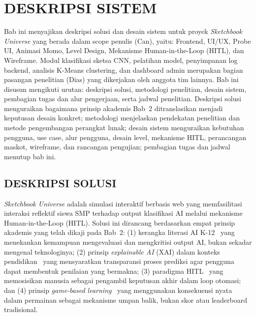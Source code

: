 \documentclass[12pt,a4paper,oneside,openany]{report}
\begin{document}
\chapter{DESKRIPSI SISTEM}
\label{chap:bab3}

Bab ini menyajikan deskripsi solusi dan desain sistem untuk proyek \textit{Sketchbook Universe} yang berada dalam scope penulis (Can), yaitu: Frontend, UI/UX, Probe UI, Animasi Momo, Level Design, Mekanisme Human-in-the-Loop (HITL), dan Wireframe. Modul klasifikasi sketsa CNN, pelatihan model, penyimpanan log backend, analisis K-Means clustering, dan dashboard admin merupakan bagian pasangan penelitian (Dias) yang dikerjakan oleh anggota tim lainnya. Bab ini disusun mengikuti urutan: deskripsi solusi, metodologi penelitian, desain sistem, pembagian tugas dan alur pengerjaan, serta jadwal penelitian. Deskripsi solusi menguraikan bagaimana prinsip akademis Bab~2 ditranslasikan menjadi keputusan desain konkret; metodologi menjelaskan pendekatan penelitian dan metode pengembangan perangkat lunak; desain sistem menguraikan kebutuhan pengguna, use case, alur pengguna, desain level, mekanisme HITL, perancangan maskot, wireframe, dan rancangan pengujian; pembagian tugas dan jadwal menutup bab ini.

\section{DESKRIPSI SOLUSI}
\label{sec:deskripsi-solusi}

\textit{Sketchbook Universe} adalah simulasi interaktif berbasis web yang memfasilitasi interaksi reflektif siswa SMP terhadap output klasifikasi AI melalui mekanisme Human-in-the-Loop (HITL). Solusi ini dirancang berdasarkan empat prinsip akademis yang telah dikaji pada Bab~2: (1) kerangka literasi AI K-12~\cite{ref2} yang menekankan kemampuan mengevaluasi dan mengkritisi output AI, bukan sekadar mengenal teknologinya; (2) prinsip \textit{explainable AI} (XAI) dalam konteks pendidikan~\cite{ref3} yang mensyaratkan transparansi proses prediksi agar pengguna dapat membentuk penilaian yang bermakna; (3) paradigma HITL~\cite{ref4}\cite{ref5} yang memosisikan manusia sebagai pengambil keputusan akhir dalam loop otomasi; dan (4) prinsip \textit{game-based learning}~\cite{ref6} yang menggunakan konsekuensi nyata dalam permainan sebagai mekanisme umpan balik, bukan skor atau leaderboard tradisional.
\end{document}
